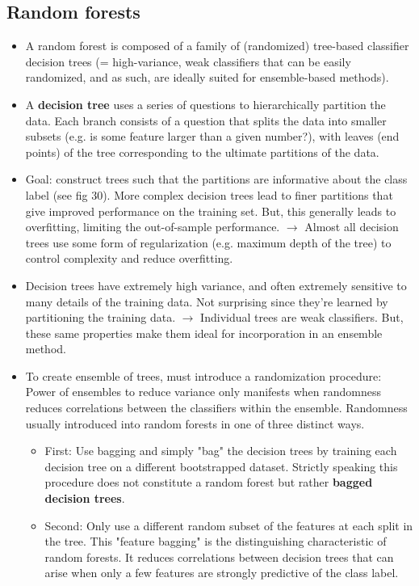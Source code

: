 \documentclass[norsk,a4paper,11pt]{article}
\begin{document}
\subsection{Random forests}
\begin{itemize}
	\item A random forest is composed of a family of (randomized) tree-based classifier decision trees (= high-variance, weak classifiers that can be easily randomized, and as such, are ideally suited for ensemble-based methods).
	\item A \textbf{decision tree} uses a series of questions to hierarchically partition the data. Each branch consists of a question that splits the data into smaller subsets (e.g. is some feature larger than a given number?), with leaves (end points) of the tree corresponding to the ultimate partitions of the data.
	\item Goal: construct trees such that the partitions are informative about the class label (see fig 30). More complex decision trees lead to finer partitions that give improved performance on the training set. But, this generally leads to overfitting, limiting the out-of-sample performance. $\rightarrow$ Almost all decision trees use some form of regularization (e.g. maximum depth of the tree) to control complexity and reduce overfitting.
	\item Decision trees have extremely high variance, and often extremely sensitive to many details of the training data. Not surprising since they're learned by partitioning the training data. $\rightarrow$ Individual trees are weak classifiers. But, these same properties make them ideal for incorporation in an ensemble method.
	\item To create ensemble of trees, must introduce a randomization procedure: Power of ensembles to reduce variance only manifests when randomness reduces correlations between the classifiers within the ensemble. Randomness usually introduced into random forests in one of three distinct ways.
	\begin{itemize}
		\item First: Use bagging and simply "bag" the decision trees by training each decision tree on a different bootstrapped dataset. Strictly speaking this procedure does not constitute a random forest but rather \textbf{bagged decision trees}.
		\item Second: Only use a different random subset of the features at each split in the tree. This "feature bagging" is the distinguishing characteristic of random forests. It reduces correlations between decision trees that can arise when only a few features are strongly predictive of the class label. 

\end{itemize}
\end{itemize}
\end{document}
